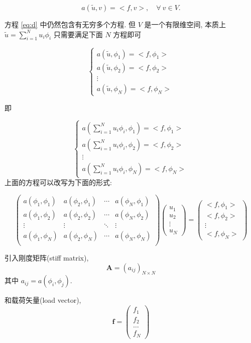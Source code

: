 \documentclass{article}
\begin{document}
\begin{equation}\label{eq:d}
a(\tilde u, v) = <f, v>,\quad\forall~v\in V.
\end{equation}

方程 \eqref{eq:d} 中仍然包含有无穷多个方程. 但 $V$ 是一个有限维空间, 本质上 $\tilde u= \sum_{i=1}^{N}u_i \phi_i$ 只需要满足下面 $N$ 方程即可

$$
\begin{cases}
a(\tilde u, \phi_1) = <f, \phi_1> \\
a(\tilde u, \phi_2) = <f, \phi_2> \\
\vdots \\
a(\tilde u, \phi_N) = <f, \phi_N> 
\end{cases}
$$

即

$$
\begin{cases}
a(\sum_{i=1}^{N}u_i \phi_i, \phi_1) = <f, \phi_1> \\
a(\sum_{i=1}^{N}u_i \phi_i, \phi_2) = <f, \phi_2> \\
\vdots \\
a(\sum_{i=1}^{N}u_i \phi_i, \phi_N) = <f, \phi_N> 
\end{cases}
$$
上面的方程可以改写为下面的形式:

$$
\begin{pmatrix}
a(\phi_1, \phi_1) & a(\phi_2, \phi_1) & \cdots & a(\phi_N, \phi_1) \\
a(\phi_1, \phi_2) & a(\phi_2, \phi_2) & \cdots & a(\phi_N, \phi_2) \\
\vdots & \vdots & \ddots & \vdots \\
a(\phi_1, \phi_N) & a(\phi_2, \phi_N) & \cdots & a(\phi_N, \phi_N) \\
\end{pmatrix}
\begin{pmatrix}
u_1 \\ u_2 \\ \vdots \\ u_N
\end{pmatrix}
= 
\begin{pmatrix}
<f, \phi_1> \\ <f, \phi_2> \\ \vdots \\ <f, \phi_N> 
\end{pmatrix}
$$

引入{\large 刚度矩阵}(stiff matrix),
$$
\mathbf{A}=(a_{ij})_{N\times N}  
$$
其中 $a_{ij}=a(\phi_i,\phi_j)$.

和{\large 载荷矢量}(load vector),
$$
\mathbf{f} = \begin{pmatrix}
f_1\\ f_2 \\ \ldots \\f_N
\end{pmatrix} 
$$ 
\end{document}

